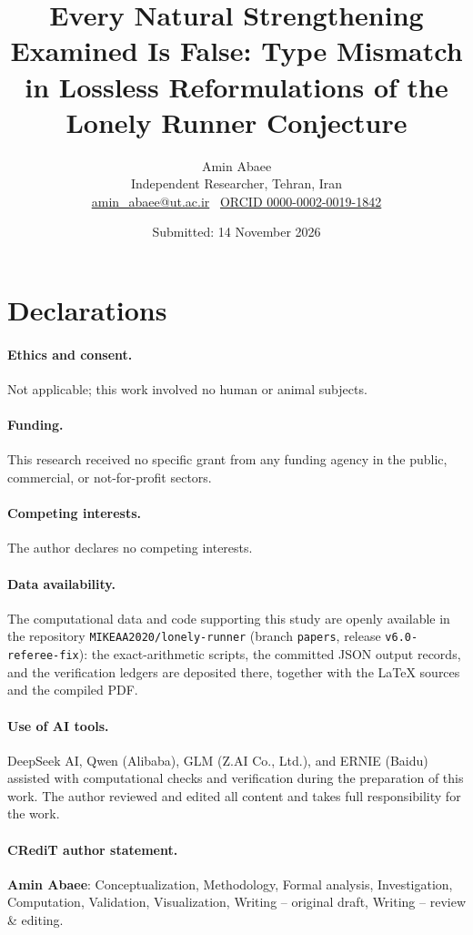 \documentclass[11pt,a4paper]{article}
\numberwithin{equation}{section}
\theoremstyle{plain}
\theoremstyle{definition}
\theoremstyle{remark}
\newcommand{\papertitle}{Every Natural Strengthening Examined Is False: Type Mismatch in Lossless Reformulations of the Lonely Runner Conjecture}
\begin{document}
\title{\papertitle}
\author{Amin Abaee\\[2pt] {\small Independent Researcher, Tehran, Iran}\\[1pt] {\small \href{mailto:amin_abaee@ut.ac.ir}{amin\_abaee@ut.ac.ir} \textbullet\ \href{https://orcid.org/0000-0002-0019-1842}{ORCID 0000-0002-0019-1842}}}
\date{Submitted: 14 November 2026}
\maketitle

\tableofcontents
\clearpage










\section*{Declarations}

\paragraph{Ethics and consent.} Not applicable; this work involved no
human or animal subjects.

\paragraph{Funding.} This research received no specific grant from any
funding agency in the public, commercial, or not-for-profit sectors.

\paragraph{Competing interests.} The author declares no competing
interests.

\paragraph{Data availability.} The computational data and code
supporting this study are openly available in the repository
\texttt{MIKEAA2020/lonely-runner} (branch \texttt{papers}, release
\texttt{v6.0-referee-fix}): the exact-arithmetic scripts, the committed
JSON output records, and the verification ledgers are deposited there,
together with the \LaTeX{} sources and the compiled PDF.

\paragraph{Use of AI tools.} DeepSeek AI, Qwen (Alibaba), GLM (Z.AI Co.,
Ltd.), and ERNIE (Baidu) assisted with computational checks and
verification during the preparation of this work. The author reviewed and
edited all content and takes full responsibility for the work.

\paragraph{CRediT author statement.} \textbf{Amin Abaee}: Conceptualization,
Methodology, Formal analysis, Investigation, Computation, Validation,
Visualization, Writing -- original draft, Writing -- review \& editing.
\end{document}

